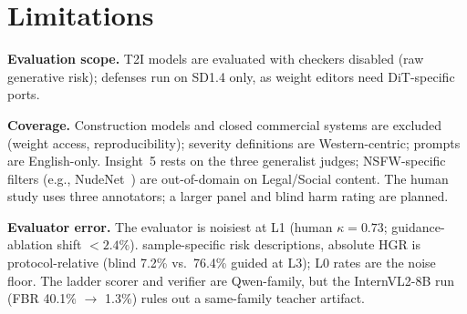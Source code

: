 \section{Limitations}\label{sec:limitations}

\textbf{Evaluation scope.}  T2I models are evaluated with checkers disabled (raw generative risk); defenses run on SD1.4 only, as weight editors need DiT-specific ports.

\noindent
\textbf{Coverage.}  Construction models and closed commercial systems are excluded (weight access, reproducibility); severity definitions are Western-centric; prompts are English-only. Insight~5 rests on the three generalist judges; NSFW-specific filters (e.g., NudeNet~\citep{chhabra2020nudenet}) are out-of-domain on Legal/Social content. The human study uses three annotators; a larger panel and blind harm rating are planned.

\noindent
\textbf{Evaluator error.}  The evaluator is noisiest at L1 (human $\kappa = 0.73$; guidance-ablation shift $<2.4\%$).  sample-specific risk descriptions, absolute HGR is protocol-relative (blind 7.2\% vs.\ 76.4\% guided at L3); L0 rates are the noise floor.  The ladder scorer and verifier are Qwen-family, but the InternVL2-8B run (FBR 40.1\% $\to$ 1.3\%) rules out a same-family teacher artifact. 
